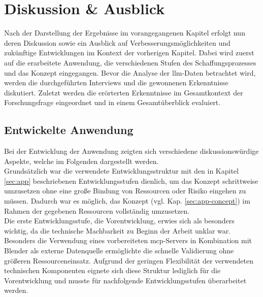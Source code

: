 \chapter{\textbf{Diskussion \& Ausblick}}
\label{chap:discussion}

Nach der Darstellung der Ergebnisse im vorangegangenen Kapitel erfolgt nun deren Diskussion 
sowie ein Ausblick auf Verbesserungsmöglichkeiten und zukünftige Entwicklungen im Kontext der vorherigen Kapitel.
Dabei wird zuerst auf die erarbeitete Anwendung, die verschiedenen Stufen des Schaffungsprozesses und das Konzept eingegangen.
Bevor die Analyse der \gls{llm}-Daten betrachtet wird, werden die durchgeführten Interviews und die gewonnenen Erkenntnisse diskutiert.
Zuletzt werden die erörterten Erkenntnisse im Gesamtkontext der Forschungsfrage eingeordnet und in einem Gesamtüberblick evaluiert.

\section{Entwickelte Anwendung}
\label{sec:discussion-app}

Bei der Entwicklung der Anwendung zeigten sich verschiedene diskussionswürdige Aspekte, welche im Folgenden dargestellt werden. \\

Grundsätzlich war die verwendete Entwicklungsstruktur mit den in Kapitel \ref{sec:app} beschriebenen Entwicklungsstufen dienlich,
um das Konzept schrittweise umzusetzen ohne eine große Bindung von Ressourcen oder Risiko eingehen zu müssen.
Dadurch war es möglich, das Konzept (vgl. Kap. \ref{sec:app-concept}) im Rahmen der gegebenen Ressourcen vollständig umzusetzen. \\

Die erste Entwicklungsstufe, die Vorentwicklung, erwies sich als besonders wichtig, da die technische Machbarkeit zu Beginn der Arbeit unklar war.
Besonders die Verwendung eines vorbereiteten \gls{mcp}-Servers in Kombination mit Blender als externe Datenquelle ermöglichte die schnelle Validierung ohne größeren Ressourceneinsatz.
Aufgrund der geringen Flexibilität der verwendeten technischen Komponenten eignete sich diese Struktur lediglich für die Vorentwicklung und musste für nachfolgende Entwicklungsstufen überarbeitet werden. \\

